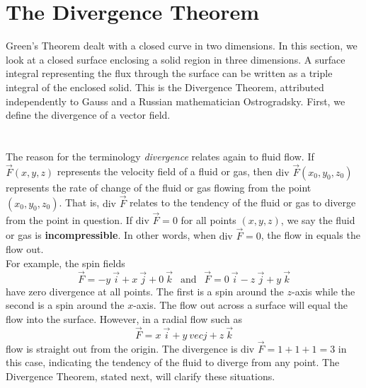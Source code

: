 \section{The Divergence Theorem}\label{sec:div_theorem}

Green's Theorem dealt with a closed curve in two dimensions.  In this section, we look at a closed surface enclosing a solid region in three dimensions.  A surface integral representing the flux through the surface can be written as a triple integral of the enclosed solid.  This is the Divergence Theorem, attributed independently to Gauss and a Russian mathematician Ostrogradsky. First, we define the divergence of a vector field.\\

\\

\\

The reason for the terminology \emph{divergence} relates again to fluid flow. If $\vec F(x,y,z)$ represents the velocity field of a fluid or gas, then $\text{div } \vec F (x_0,y_0,z_0)$ represents the rate of change of the fluid or gas flowing from the point $(x_0,y_0,z_0)$. That is, $\text{div } \vec F$ relates to the tendency of the fluid or gas to diverge from the point in question. If $\text{div } \vec F = 0$ for all points $(x,y,z)$, we say the fluid or gas is \textbf{incompressible}. In other words, when $\text{div } \vec F = 0$, the flow in equals the flow out.\\

For example, the spin fields $$\vec F = -y \: \vec i + x \: \vec j + 0 \: \vec k \: \: \text{ and } \: \: \vec F = 0 \: \vec i - z \: \vec j + y \: \vec k$$
have zero divergence at all points.  The first is a spin around the $z$-axis while the second is a spin around the $x$-axis.  The flow out across a surface will equal the flow into the surface. However, in a radial flow such as $$\vec F = x \: \vec i + y \: vec j + z \: \vec k$$ flow is straight out from the origin.  The divergence is $\text{div } \vec F = 1 + 1 + 1 = 3$ in this case, indicating the tendency of the fluid to diverge from any point.  The Divergence Theorem, stated next, will clarify these situations.\\

